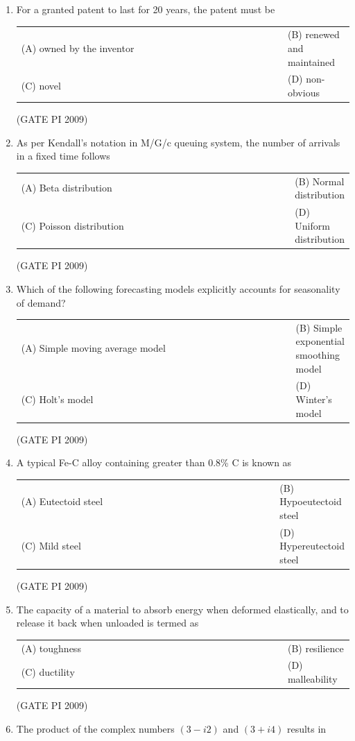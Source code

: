 \documentclass[journal,12pt,onecolumn]{IEEEtran}
\theoremstyle{remark}
\begin{document}
\begin{enumerate}[label=Q.\arabic*, leftmargin=*]
(A) $h^2$ \hfill (B) $h^3$ \hfill(C) $h^4$ \hfill (D) $h^5$ \hfill
\hfill (GATE PI 2009)
\item For a granted patent to last for 20 years, the patent must be
\begin{multicols}{2}
\begin{tabular}[t]{p{0.8\linewidth} p{0.9\linewidth}}
(A) owned by the inventor & (B) renewed and maintained \\
(C) novel & (D) non-obvious \\
\end{tabular}
\end{multicols}
\hfill (GATE PI 2009)
\item As per Kendall's notation in M/G/c queuing system, the number of arrivals in a fixed time follows
\begin{multicols}{2}
\begin{tabular}[t]{p{1.4\linewidth} p{1\linewidth}}
(A) Beta distribution & (B) Normal distribution \\
(C) Poisson distribution & (D) Uniform distribution \\
\end{tabular}
\end{multicols}
\hfill (GATE PI 2009)
\item Which of the following forecasting models explicitly accounts for seasonality of demand?
\begin{multicols}{2}
\begin{tabular}[t]{p{0.9\linewidth} p{0.9\linewidth}}
(A) Simple moving average  model & (B) Simple exponential smoothing model \\
(C) Holt's model & (D) Winter's model \\
\end{tabular}
\end{multicols}
\hfill (GATE PI 2009)
\item A typical Fe-C alloy containing greater than 0.8\% C is known as
\begin{multicols}{2}
\begin{tabular}[t]{p{0.8\linewidth} p{0.9\linewidth}}
(A) Eutectoid steel & (B) Hypoeutectoid steel \\
(C) Mild steel & (D) Hypereutectoid steel \\
\end{tabular}
\end{multicols}
\hfill (GATE PI 2009)
\item The capacity of a material to absorb energy when deformed elastically, and to release it back when unloaded is termed as
\begin{multicols}{2}
\begin{tabular}[t]{p{0.8\linewidth} p{0.9\linewidth}}
(A) toughness & (B) resilience \\
(C) ductility & (D) malleability \\
\end{tabular}
\end{multicols}
\hfill (GATE PI 2009)
\item The product of the complex numbers \((3 - i2)\) and \((3 + i4)\) results in


\end{enumerate}
\end{document}
